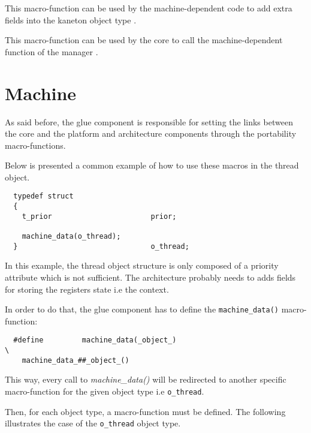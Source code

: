 	 {
	   This macro-function can be used by the machine-dependent code
	   to add extra fields into the kaneton object type .
	 }

	 {
	   This macro-function can be used by the core to call the
	   machine-dependent function  of the manager
	   .
	 }

%
%

\section{Machine}

As said before, the glue component is responsible for setting the links between
the core and the platform and architecture components through the portability
macro-functions.

Below is presented a common example of how to use these macros in the
thread object.

\begin{verbatim}
  typedef struct
  {
    t_prior                       prior;

    machine_data(o_thread);
  }                               o_thread;
\end{verbatim}

In this example, the thread object structure is only composed of a priority
attribute which is not sufficient. The architecture probably needs to
adds fields for storing the registers state i.e the context.

In order to do that, the glue component has to define the
\texttt{machine\_data()} macro-function:

\begin{verbatim}
  #define         machine_data(_object_)                                  \
    machine_data_##_object_()
\end{verbatim}

This way, every call to \textit{machine\_data()} will be redirected to another
specific macro-function for the given object type i.e \texttt{o\_thread}.

Then, for each object type, a macro-function must be defined. The following
illustrates the case of the \texttt{o\_thread} object type.

